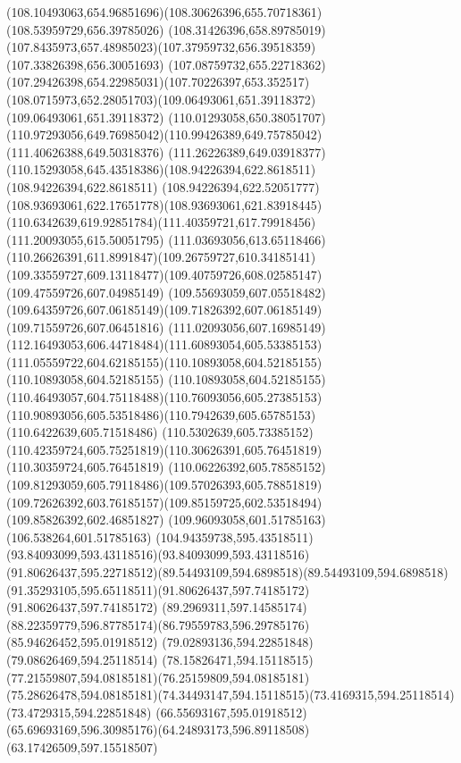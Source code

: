 {{	\curveto(108.10493063,654.96851696)(108.30626396,655.70718361)(108.53959729,656.39785026)
	\lineto(108.31426396,658.89785019)
	\curveto(107.8435973,657.48985023)(107.37959732,656.39518359)(107.33826398,656.30051693)
	\curveto(107.08759732,655.22718362)(107.29426398,654.22985031)(107.70226397,653.352517)
	\curveto(108.0715973,652.28051703)(109.06493061,651.39118372)(109.06493061,651.39118372)
	\curveto(110.01293058,650.38051707)(110.97293056,649.76985042)(110.99426389,649.75785042)
	\lineto(111.40626388,649.50318376)
	\lineto(111.26226389,649.03918377)
	\curveto(110.15293058,645.43518386)(108.94226394,622.8618511)(108.94226394,622.8618511)
	\curveto(108.94226394,622.52051777)(108.93693061,622.17651778)(108.93693061,621.83918445)
	\curveto(110.6342639,619.92851784)(111.40359721,617.79918456)(111.20093055,615.50051795)
	\curveto(111.03693056,613.65118466)(110.26626391,611.8991847)(109.26759727,610.34185141)
	\curveto(109.33559727,609.13118477)(109.40759726,608.02585147)(109.47559726,607.04985149)
	\curveto(109.55693059,607.05518482)(109.64359726,607.06185149)(109.71826392,607.06185149)
	\lineto(109.71559726,607.06451816)
	\curveto(111.02093056,607.16985149)(112.16493053,606.44718484)(111.60893054,605.53385153)
	\curveto(111.05559722,604.62185155)(110.10893058,604.52185155)(110.10893058,604.52185155)
	\curveto(110.10893058,604.52185155)(110.46493057,604.75118488)(110.76093056,605.27385153)
	\curveto(110.90893056,605.53518486)(110.7942639,605.65785153)(110.6422639,605.71518486)
	\curveto(110.5302639,605.73385152)(110.42359724,605.75251819)(110.30626391,605.76451819)
	\lineto(110.30359724,605.76451819)
	\curveto(110.06226392,605.78585152)(109.81293059,605.79118486)(109.57026393,605.78851819)
	\curveto(109.72626392,603.76185157)(109.85159725,602.53518494)(109.85826392,602.46851827)
	\lineto(109.96093058,601.51785163)
	\lineto(106.538264,601.51785163)
	\curveto(104.94359738,595.43518511)(93.84093099,593.43118516)(93.84093099,593.43118516)
	\curveto(91.80626437,595.22718512)(89.54493109,594.6898518)(89.54493109,594.6898518)
	\curveto(91.35293105,595.65118511)(91.80626437,597.74185172)(91.80626437,597.74185172)
	\lineto(89.2969311,597.14585174)
	\curveto(88.22359779,596.87785174)(86.79559783,596.29785176)(85.94626452,595.01918512)
	\lineto(79.02893136,594.22851848)
	\lineto(79.08626469,594.25118514)
	\curveto(78.15826471,594.15118515)(77.21559807,594.08185181)(76.25159809,594.08185181)
	\curveto(75.28626478,594.08185181)(74.34493147,594.15118515)(73.4169315,594.25118514)
	\lineto(73.4729315,594.22851848)
	\lineto(66.55693167,595.01918512)
	\curveto(65.69693169,596.30985176)(64.24893173,596.89118508)(63.17426509,597.15518507)
}}
